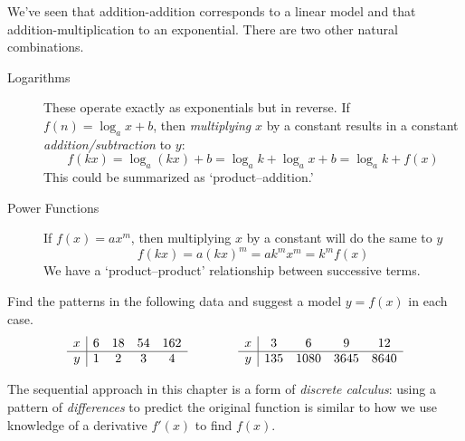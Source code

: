We've seen that addition-addition corresponds to a linear model and that addition-multiplication to an exponential. There are two other natural combinations.

\begin{description}
	\item[Logarithms] These operate exactly as exponentials but in reverse. If $f(n)=\log_a x+b$, then \emph{multiplying} $x$ by a constant results in a constant \emph{addition/subtraction} to $y$:
		\[
			f(kx)=\log_a(kx)+b=\log_ak+\log_ax+b=\log_ak+f(x)
		\]
		This could be summarized as `product--addition.'
	\item[Power Functions] If $f(x)=ax^m$, then multiplying $x$ by a constant will do the same to $y$
		\[
			f(kx)=a(kx)^m=ak^mx^m=k^mf(x)
		\]
		We have a `product--product' relationship between successive terms.
\end{description}


\begin{examples}{}{}
	Find the patterns in the following data and suggest a model $y=f(x)$ in each case.
	\[
		\begin{array}[t]{c|cccc}
			x&6&18&54&162\\\hline
			y&1&2&3&4
		\end{array}
		\qquad\qquad
		\begin{array}[t]{c|cccc}
			x&3&6&9&12\\\hline
			y&135&1080&3645&8640
		\end{array}
	\]
\end{examples}

The sequential approach in this chapter is a form of \emph{discrete calculus}: using a pattern of \emph{differences} to predict the original function is similar to how we use knowledge of a derivative $f'(x)$ to find $f(x)$.

\goodbreak



